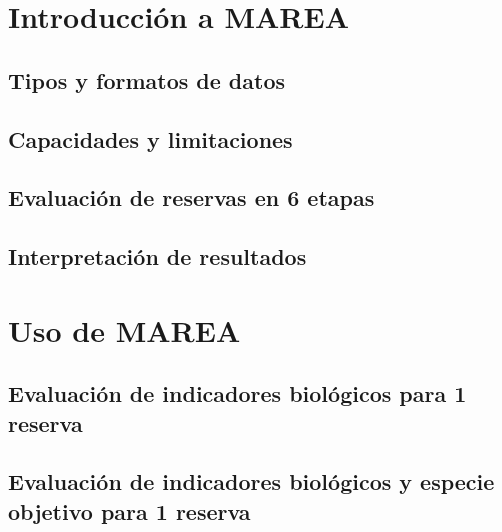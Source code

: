 \documentclass[]{book}
\begin{document}
\hypertarget{introduccion-a-marea}{%
\chapter{Introducción a MAREA}\label{introduccion-a-marea}}

\hypertarget{tipos-y-formatos-de-datos}{%
\section{Tipos y formatos de datos}\label{tipos-y-formatos-de-datos}}

\hypertarget{capacidades-y-limitaciones}{%
\section{Capacidades y limitaciones}\label{capacidades-y-limitaciones}}

\hypertarget{evaluacion-de-reservas-en-6-etapas}{%
\section{Evaluación de reservas en 6
etapas}\label{evaluacion-de-reservas-en-6-etapas}}

\hypertarget{interpretacion-de-resultados}{%
\section{Interpretación de
resultados}\label{interpretacion-de-resultados}}

\hypertarget{uso-de-marea}{%
\chapter{Uso de MAREA}\label{uso-de-marea}}

\hypertarget{evaluacion-de-indicadores-biologicos-para-1-reserva}{%
\section{Evaluación de indicadores biológicos para 1
reserva}\label{evaluacion-de-indicadores-biologicos-para-1-reserva}}

\hypertarget{evaluacion-de-indicadores-biologicos-y-especie-objetivo-para-1-reserva}{%
\section{Evaluación de indicadores biológicos y especie objetivo para 1
reserva}\label{evaluacion-de-indicadores-biologicos-y-especie-objetivo-para-1-reserva}}
\end{document}
